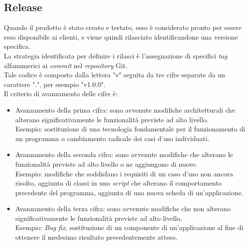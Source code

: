 \subsection{Release}
Quando il prodotto è stato creato e testato, esso è considerato pronto per essere reso disponibile ai clienti, e viene quindi rilasciato identificandone una versione specifica.\\
La strategia identificata per definire i rilasci è l'assegnazione di specifici \emph{tag} alfanumerici ai \emph{commit} nel \emph{repository} Git.\\
Tale codice è composto dalla lettera "v" seguita da tre cifre separate da un carattere ".", per esempio "v1.0.0".\\
Il criterio di avanzamento delle cifre è: 
\begin{itemize}
    \item Avanzamento della prima cifra: sono avvenute modifiche architetturali che alterano significativamente le funzionalità previste ad alto livello.\\
    Esempio: sostituzione di una tecnologia fondamentale per il funzionamento di un programma o cambiamento radicale dei casi d'uso individuati.  
    \item Avanzamento della seconda cifra: sono avvenute modifiche che alterano le funzionalità previste ad alto livello o ne aggiungono di nuove.\\
    Esempio: modifiche che soddisfano i requisiti di un caso d'uso non ancora risolto, aggiunta di classi in uno \emph{script} che alterano il comportamento precedente del programma, aggiunta di una nuova scheda di un'applicazione.
    \item Avanzamento della terza cifra: sono avvenute modifiche che non alterano significativamente le funzionalità previste ad alto livello.\\
    Esempio: \emph{Bug fix}, sostituzione di un componente di un'applicazione al fine di ottenere il medesimo risultato precedentemente atteso. 
\end{itemize}
    

